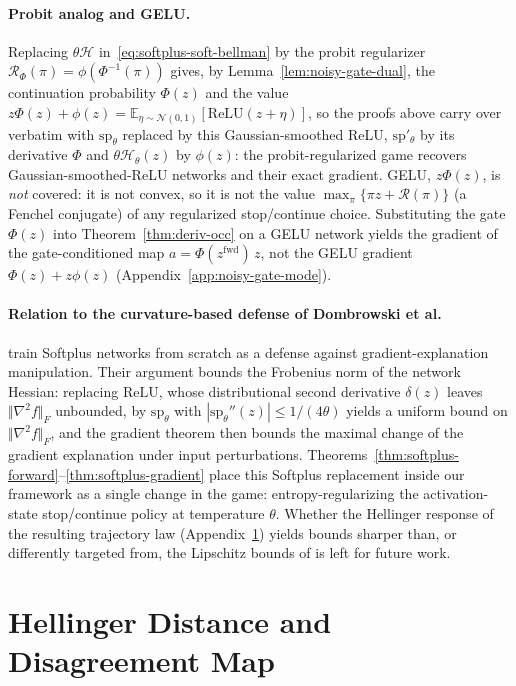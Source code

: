\documentclass[twoside]{article}
\providecommand{\E}{}
\renewcommand{\E}{\mathbb{E}}
\newcommand{\relu}{\text{ReLU}}
\newcommand{\1}{\mathbf{1}}
\begin{document}
\paragraph{Probit analog and GELU.}
Replacing $\theta\mathcal{H}$ in~\eqref{eq:softplus-soft-bellman} by the probit regularizer
$\mathcal{R}_\Phi(\pi) = \phi(\Phi^{-1}(\pi))$ gives, by Lemma~\ref{lem:noisy-gate-dual}, the
continuation probability $\Phi(z)$ and the value $z\Phi(z) + \phi(z) = \E_{\eta \sim
    \mathcal{N}(0,1)}[\relu(z + \eta)]$, so the proofs above carry over verbatim with
$\mathrm{sp}_\theta$ replaced by this Gaussian-smoothed ReLU, $\mathrm{sp}'_\theta$ by its
derivative $\Phi$ and $\theta\mathcal{H}_\theta(z)$ by $\phi(z)$: the probit-regularized game
recovers Gaussian-smoothed-ReLU networks and their exact gradient. \acs{GELU}, $z\Phi(z)$, is
\emph{not} covered: it is not convex, so it is not the value $\max_\pi\{\pi z + \mathcal{R}(\pi)\}$
(a Fenchel conjugate) of any regularized stop/continue choice. Substituting the gate $\Phi(z)$ into
Theorem~\ref{thm:deriv-occ} on a \acs{GELU} network yields the gradient of the gate-conditioned map
$a = \Phi(z^{\mathrm{fwd}})\, z$, not the \acs{GELU} gradient $\Phi(z) + z\phi(z)$
(Appendix~\ref{app:noisy-gate-mode}).

\paragraph{Relation to the curvature-based defense of Dombrowski et
al.}\label{app:softplus-dombrowski}
\citet{Dombrowski2020} train Softplus networks from scratch as a defense against
gradient-explanation manipulation. Their argument bounds the Frobenius norm of the network Hessian:
replacing $\mathrm{ReLU}$, whose distributional second derivative $\delta(z)$ leaves $\Vert
    \nabla^2 f \Vert_F$ unbounded, by $\mathrm{sp}_\theta$ with $|\mathrm{sp}_\theta''(z)| \le
    1/(4\theta)$ yields a uniform bound on $\Vert \nabla^2 f \Vert_F$, and the gradient theorem then
bounds the maximal change of the gradient explanation under input perturbations.
Theorems~\ref{thm:softplus-forward}--\ref{thm:softplus-gradient} place this Softplus replacement
inside our framework as a single change in the game: entropy-regularizing the activation-state
stop/continue policy at temperature $\theta$. Whether the Hellinger response of the resulting
trajectory law (Appendix~\ref{app:path-divergence}) yields bounds sharper than, or differently
targeted from, the Lipschitz bounds of \citet{Dombrowski2020} is left for future work.
\newpage
\section{Hellinger Distance and Disagreement Map}\label{app:path-divergence}
\end{document}
